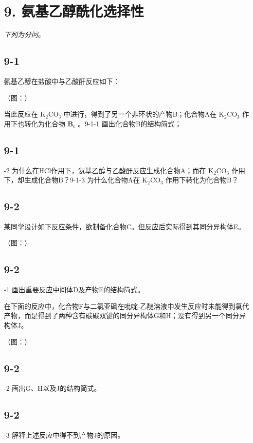 \section*{9. 氨基乙醇酰化选择性}
\textit{下列为分问。}

\subsection*{9-1}
氨基⼄醇在盐酸中与⼄酸酐反应如下：

（图：）

当此反应在 $\mathrm { K _ { 2 } C O _ { 3 } }$ 中进⾏，得到了另⼀个⾮环状的产物B；化合物A在 $\mathrm { K _ { 2 } C O _ { 3 } }$ 作⽤下也转化为化合物 $\mathbf { B } _ { \mathrm { c } }$ 。9-1-1 画出化合物B的结构简式；

\subsection*{9-1}
-2 为什么在HCl作⽤下，氨基⼄醇与⼄酸酐反应⽣成化合物A；⽽在 $\mathrm { K _ { 2 } C O _ { 3 } }$ 作⽤下，却⽣成化合物B？9-1-3 为什么化合物A在 $\mathrm { K _ { 2 } C O _ { 3 } }$ 作⽤下转化为化合物B？

\subsection*{9-2}
某同学设计如下反应条件，欲制备化合物C。但反应后实际得到其同分异构体E。

（图：）

\subsection*{9-2}
-1 画出重要反应中间体D及产物E的结构简式。

在下⾯的反应中，化合物F与⼆氯亚砜在吡啶-⼄醚溶液中发⽣反应时未能得到氯代产物，⽽是得到了两种含有碳碳双键的同分异构体G和H；没有得到另⼀个同分异构体J。

（图：）

\subsection*{9-2}
-2 画出G、H以及J的结构简式。

\subsection*{9-2}
-3 解释上述反应中得不到产物J的原因。
